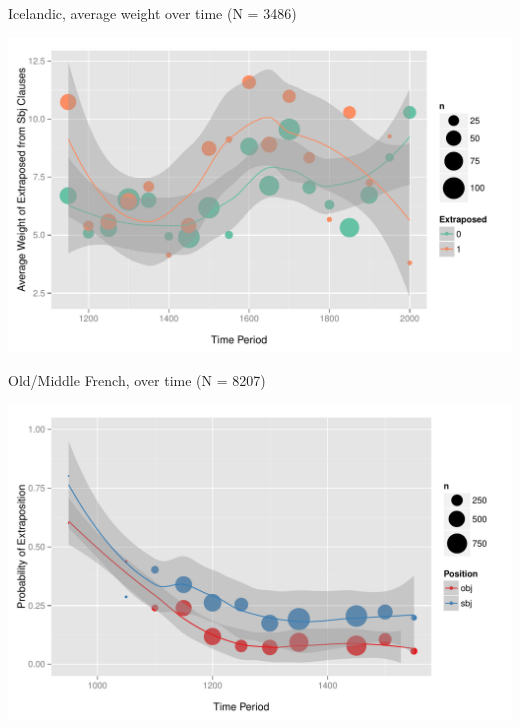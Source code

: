 \documentclass[hyperref={pdfpagelabels=false}]{beamer}
\begin{document}
\begin{frame}{Icelandic, average weight over time (N = 3486)}

\begin{center}
\includegraphics[width=1.1\textwidth]{exWeightYearBinned50Loessice.pdf}
\end{center}
\end{frame}



\begin{frame}{Old/Middle French, over time (N = 8207)}

\begin{center}
\includegraphics[width=1.1\textwidth]{exSbjObjYearBinned50Loessfre.pdf}
\end{center}
\end{frame}
\end{document}
